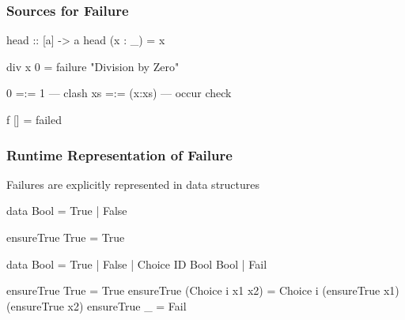 \documentclass[
,hyperref={pdfpagelabels=false}
,xcolor=dvipsnames
]{beamer}
\begin{document}
\begin{frame}[fragile]%
\frametitle{Sources for Failure}

\begin{curry}
head :: [a] -> a
head (x : _) = x
\end{curry}

\begin{curry}
div x 0 = failure "{}Division by Zero"
\end{curry}

\begin{curry}
0  =:= 1      --- clash
xs =:= (x:xs) --- occur check
\end{curry}

\begin{curry}
f [] = failed
\end{curry}
\end{frame}


\begin{frame}[fragile]%
\frametitle{Runtime Representation of Failure}

Failures are explicitly represented in data structures

\begin{curry}
data Bool = True | False

ensureTrue True = True
\end{curry}

\begin{haskell}
data Bool = True | False | Choice ID Bool Bool | \alert{Fail}

ensureTrue True             = True
ensureTrue (Choice i x1 x2) = Choice i (ensureTrue x1)
                                       (ensureTrue x2)
\alert{ensureTrue _                = Fail}
\end{haskell}
\end{frame}
\end{document}
